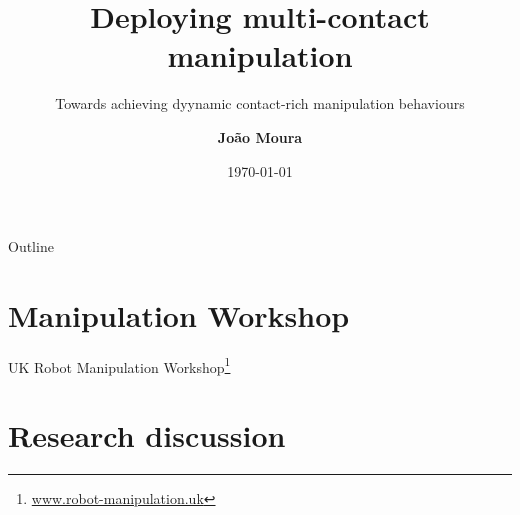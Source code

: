 \documentclass[aspectratio=169]{beamer}
\title{Deploying multi-contact manipulation}
\subtitle{Towards achieving dyynamic contact-rich manipulation behaviours}
\author{\textbf{Jo\~{a}o Moura}}
\date{\today}
\begin{document}


\begin{frame}
  \maketitle
\end{frame}

\begin{frame}{Outline}
    \tableofcontents
\end{frame}

\section{Manipulation Workshop}

\begin{frame}{UK Robot Manipulation Workshop\footnote{\href{https://www.robot-manipulation.uk}{www.robot-manipulation.uk}}}
  \begin{center}
    \begin{figure}
    \end{figure}
  \end{center}
\end{frame}

\section{Research discussion}
\end{document}
